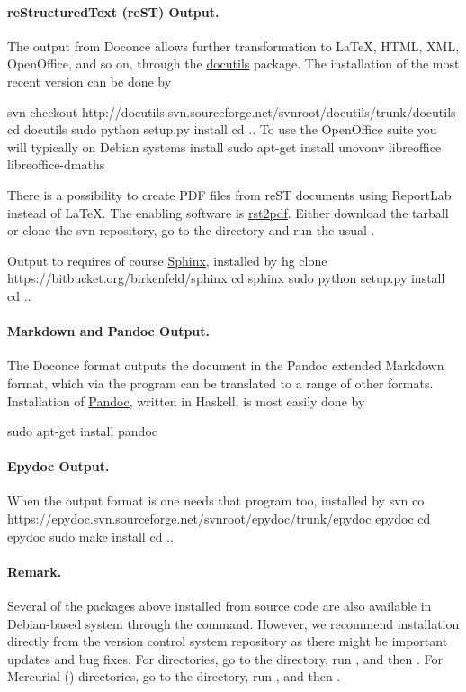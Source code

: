 \documentclass[twoside]{book}
\begin{document}
\paragraph{reStructuredText (reST) Output.}
The  output from Doconce allows further transformation to {\LaTeX},
HTML, XML, OpenOffice, and so on, through the \href{{http://docutils.sourceforge.net}}{docutils} package.  The installation of the
most recent version can be done by

\bsys
svn checkout http://docutils.svn.sourceforge.net/svnroot/docutils/trunk/docutils
cd docutils
sudo python setup.py install
cd ..
\esys
To use the OpenOffice suite you will typically on Debian systems install
\bsys
sudo apt-get install unovonv libreoffice libreoffice-dmaths
\esys

There is a possibility to create PDF files from reST documents
using ReportLab instead of {\LaTeX}. The enabling software is
\href{{http://code.google.com/p/rst2pdf}}{rst2pdf}. Either download the tarball
or clone the svn repository, go to the  directory and
run the usual .


Output to  requires of course \href{{http://sphinx.pocoo.org}}{Sphinx},
installed by
\bsys
hg clone https://bitbucket.org/birkenfeld/sphinx
cd sphinx
sudo python setup.py install
cd ..
\esys

\paragraph{Markdown and Pandoc Output.}
The Doconce format  outputs the document in the Pandoc
extended Markdown format, which via the  program can be
translated to a range of other formats. Installation of \href{{http://johnmacfarlane.net/pandoc/}}{Pandoc}, written in Haskell, is most
easily done by

\bsys
sudo apt-get install pandoc
\esys

\paragraph{Epydoc Output.}
When the output format is  one needs that program too, installed
by
\bsys
svn co https://epydoc.svn.sourceforge.net/svnroot/epydoc/trunk/epydoc epydoc
cd epydoc
sudo make install
cd ..
\esys

\paragraph{Remark.}
Several of the packages above installed from source code
are also available in Debian-based system through the
 command. However, we recommend installation directly
from the version control system repository as there might be important
updates and bug fixes. For  directories, go to the directory,
run , and then . For
Mercurial () directories, go to the directory, run
, and then .

\printindex
\end{document}
